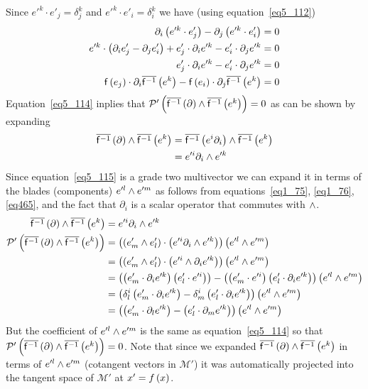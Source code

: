 Since $e'^{k}\cdot e'_{j} = \delta_{j}^{k}$ and $e'^{k}\cdot e'_{i} = \delta_{i}^{k}$ we have (using equation~\ref{eq5_112})
\begin{align}\label{eq5_114}
	\partial_{i}\left ( {e'^{k}\cdot e'_{j}} \right )-\partial_{j}\left ( {e'^{k}\cdot e'_{i}} \right ) &= 0 \nonumber \\
	e'^{k}\cdot\left ( {\partial_{i}e'_{j}-\partial_{j}e'_{i}} \right )+e'_{j}\cdot\partial_{i}e'^{k}-e'_{i}\cdot\partial_{j}e'^{k} &= 0 \nonumber \\
	e'_{j}\cdot\partial_{i}e'^{k}-e'_{i}\cdot\partial_{j}e'^{k} &= 0 \nonumber \\
	{\mathsf{f}}\left ( {e_{j}} \right )\cdot\partial_{i}{\overline{\mathsf{f}^{-1}}}\left ( {e^{k}} \right )-{\mathsf{f}}\left ( {e_{i}} \right )\cdot\partial_{j}{\overline{\mathsf{f}^{-1}}}\left ( {e^{k}} \right ) &= 0
\end{align}
Equation~\ref{eq5_114} inplies that ${\mathcal{P}'}\left ( {{\overline{\mathsf{f}^{-1}}}\left ( {\partial} \right )\wedge{\overline{\mathsf{f}^{-1}}}\left ( {e^{k}} \right )} \right )=0$ as can be shown by expanding
\begin{align}\label{eq5_115}
	{\overline{\mathsf{f}^{-1}}}\left ( {\partial} \right )\wedge{\overline{\mathsf{f}^{-1}}}\left ( {e^{k}} \right ) &= {\overline{\mathsf{f}^{-1}}}\left ( {e^{i}\partial_{i}} \right )\wedge{\overline{\mathsf{f}^{-1}}}\left ( {e^{k}} \right ) \nonumber \\
															  &= e'^{i}\partial_{i}\wedge e'^{k}
\end{align}
Since equation~\ref{eq5_115} is a grade two multivector we can expand it in terms of the blades (components) $e'^{l}\wedge e'^{m}$ as follows from
equations~\ref{eq1_75}, \ref{eq1_76}, \ref{eq465}, and the fact that $\partial_{i}$ is a scalar operator that commutes with $\wedge$.
\begin{align}\label{eq5_116}
	{\overline{\mathsf{f}^{-1}}}\left ( {\partial} \right )\wedge{\overline{\mathsf{f}^{-1}}}\left ( {e^{k}} \right ) &= e'^{i}\partial_{i}\wedge e'^{k} \nonumber \\
	{\mathcal{P}'}\left ( {{\overline{\mathsf{f}^{-1}}}\left ( {\partial} \right )\wedge{\overline{\mathsf{f}^{-1}}}\left ( {e^{k}} \right )} \right ) &= \left ( {\left ( {e'_{m}\wedge e'_{l}} \right )\cdot\left ( {e'^{i}\partial_{i}\wedge e'^{k}} \right )} \right )\left ( {e'^{l}\wedge e'^{m}} \right ) \nonumber \\
															  &= \left ( {\left ( {e'_{m}\wedge e'_{l}} \right )\cdot\left ( {e'^{i}\wedge \partial_{i}e'^{k}} \right )} \right )\left ( {e'^{l}\wedge e'^{m}} \right ) \nonumber \\
															  &= \left ( {\left ( {e'_{m}\cdot\partial_{i}e'^{k}} \right )\left ( {e'_{l}\cdot e'^{i}} \right )} \right )-
															     \left ( {\left ( {e'_{m}\cdot e'^{i}} \right )\left ( {e'_{l}\cdot \partial_{i}e'^{k}} \right )} \right )\left ( {e'^{l}\wedge e'^{m}} \right ) \nonumber \\
															  &= \left ( {\delta_{l}^{i}\left ( {e'_{m}\cdot\partial_{i}e'^{k}} \right )-
															     \delta_{m}^{i}\left ( {e'_{l}\cdot \partial_{i}e'^{k}} \right )} \right )\left ( {e'^{l}\wedge e'^{m}} \right )  \nonumber \\
															  &= \left ( {\left ( {e'_{m}\cdot\partial_{l}e'^{k}} \right )-\left ( {e'_{l}\cdot \partial_{m}e'^{k}} \right )} \right )\left ( {e'^{l}\wedge e'^{m}} \right )
\end{align}
But the coefficient of $e'^{l}\wedge e'^{m}$ is the same as equation~\ref{eq5_114} so that ${\mathcal{P}'}\left ( {{\overline{\mathsf{f}^{-1}}}\left ( {\partial} \right )\wedge{\overline{\mathsf{f}^{-1}}}\left ( {e^{k}} \right )} \right )=0$.  Note
that since we expanded ${\overline{\mathsf{f}^{-1}}}\left ( {\partial} \right )\wedge{\overline{\mathsf{f}^{-1}}}\left ( {e^{k}} \right )$ in terms of $e'^{l}\wedge e'^{m}$ (cotangent vectors in $\mathcal{M}'$) it was automatically projected into the tangent space of
$\mathcal{M}'$ at $x' = {f}\left ( {x} \right )$.

